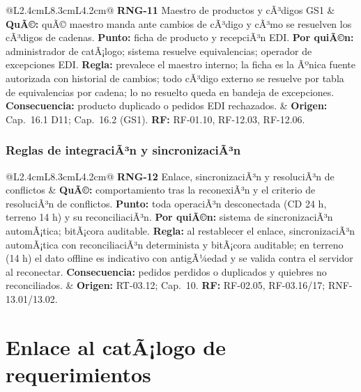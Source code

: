 \begin{table}[htbp]
\begin{tabularx}{\textwidth}{@{}L{2.4cm}L{8.3cm}L{4.2cm}@{}}
\addlinespace
\textbf{RNG-11} \textbar{} Maestro de productos y cÃ³digos GS1 &
\textbf{QuÃ©:} quÃ© maestro manda ante cambios de cÃ³digo y cÃ³mo se resuelven los cÃ³digos de
cadenas. \textbf{Punto:} ficha de producto y recepciÃ³n EDI. \textbf{Por quiÃ©n:}
administrador de catÃ¡logo; sistema resuelve equivalencias; operador de excepciones EDI.
\textbf{Regla:} prevalece el maestro interno; la ficha es la Ãºnica fuente autorizada con
historial de cambios; todo cÃ³digo externo se resuelve por tabla de equivalencias por
cadena; lo no resuelto queda en bandeja de excepciones. \textbf{Consecuencia:} producto
duplicado o pedidos EDI rechazados. &
\textbf{Origen:} Cap.\ 16.1 D11; Cap.\ 16.2 (GS1). \textbf{RF:} RF-01.10, RF-12.03,
RF-12.06. \\
\bottomrule
\end{tabularx}
\end{table}

\subsubsection{Reglas de integraciÃ³n y sincronizaciÃ³n}

\begin{table}[htbp]
\centering
\small
\begin{tabularx}{\textwidth}{@{}L{2.4cm}L{8.3cm}L{4.2cm}@{}}
\toprule
\textbf{RNG-12} \textbar{} Enlace, sincronizaciÃ³n y resoluciÃ³n de conflictos &
\textbf{QuÃ©:} comportamiento tras la reconexiÃ³n y el criterio de resoluciÃ³n de
conflictos. \textbf{Punto:} toda operaciÃ³n desconectada (CD 24 h, terreno 14 h) y su
reconciliaciÃ³n. \textbf{Por quiÃ©n:} sistema de sincronizaciÃ³n automÃ¡tica; bitÃ¡cora
auditable. \textbf{Regla:} al restablecer el enlace, sincronizaciÃ³n automÃ¡tica con
reconciliaciÃ³n determinista y bitÃ¡cora auditable; en terreno (14 h) el dato offline es
indicativo con antigÃ¼edad y se valida contra el servidor al reconectar.
\textbf{Consecuencia:} pedidos perdidos o duplicados y quiebres no reconciliados. &
\textbf{Origen:} RT-03.12; Cap.\ 10. \textbf{RF:} RF-02.05, RF-03.16/17; RNF-13.01/13.02. \\
\bottomrule
\end{tabularx}
\end{table}

\section{Enlace al catÃ¡logo de requerimientos}


